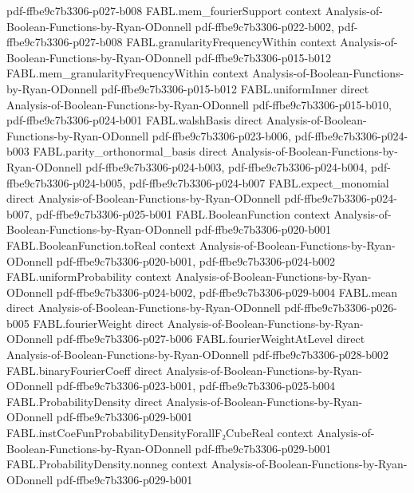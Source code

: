 \begin{theorem}
{    pdf-ffbe9c7b3306-p027-b008}
\proofstep
  {FABL.mem_fourierSupport}
  {context}
  {Analysis-of-Boolean-Functions-by-Ryan-ODonnell}
  {pdf-ffbe9c7b3306-p022-b002,
    pdf-ffbe9c7b3306-p027-b008}
\proofstep
  {FABL.granularityFrequencyWithin}
  {context}
  {Analysis-of-Boolean-Functions-by-Ryan-ODonnell}
  {pdf-ffbe9c7b3306-p015-b012}
\proofstep
  {FABL.mem_granularityFrequencyWithin}
  {context}
  {Analysis-of-Boolean-Functions-by-Ryan-ODonnell}
  {pdf-ffbe9c7b3306-p015-b012}
\proofstep
  {FABL.uniformInner}
  {direct}
  {Analysis-of-Boolean-Functions-by-Ryan-ODonnell}
  {pdf-ffbe9c7b3306-p015-b010,
    pdf-ffbe9c7b3306-p024-b001}
\proofstep
  {FABL.walshBasis}
  {direct}
  {Analysis-of-Boolean-Functions-by-Ryan-ODonnell}
  {pdf-ffbe9c7b3306-p023-b006,
    pdf-ffbe9c7b3306-p024-b003}
\proofstep
  {FABL.parity_orthonormal_basis}
  {direct}
  {Analysis-of-Boolean-Functions-by-Ryan-ODonnell}
  {pdf-ffbe9c7b3306-p024-b003,
    pdf-ffbe9c7b3306-p024-b004,
    pdf-ffbe9c7b3306-p024-b005,
    pdf-ffbe9c7b3306-p024-b007}
\proofstep
  {FABL.expect_monomial}
  {direct}
  {Analysis-of-Boolean-Functions-by-Ryan-ODonnell}
  {pdf-ffbe9c7b3306-p024-b007,
    pdf-ffbe9c7b3306-p025-b001}
\proofstep
  {FABL.BooleanFunction}
  {context}
  {Analysis-of-Boolean-Functions-by-Ryan-ODonnell}
  {pdf-ffbe9c7b3306-p020-b001}
\proofstep
  {FABL.BooleanFunction.toReal}
  {context}
  {Analysis-of-Boolean-Functions-by-Ryan-ODonnell}
  {pdf-ffbe9c7b3306-p020-b001,
    pdf-ffbe9c7b3306-p024-b002}
\proofstep
  {FABL.uniformProbability}
  {context}
  {Analysis-of-Boolean-Functions-by-Ryan-ODonnell}
  {pdf-ffbe9c7b3306-p024-b002,
    pdf-ffbe9c7b3306-p029-b004}
\proofstep
  {FABL.mean}
  {direct}
  {Analysis-of-Boolean-Functions-by-Ryan-ODonnell}
  {pdf-ffbe9c7b3306-p026-b005}
\proofstep
  {FABL.fourierWeight}
  {direct}
  {Analysis-of-Boolean-Functions-by-Ryan-ODonnell}
  {pdf-ffbe9c7b3306-p027-b006}
\proofstep
  {FABL.fourierWeightAtLevel}
  {direct}
  {Analysis-of-Boolean-Functions-by-Ryan-ODonnell}
  {pdf-ffbe9c7b3306-p028-b002}
\proofstep
  {FABL.binaryFourierCoeff}
  {direct}
  {Analysis-of-Boolean-Functions-by-Ryan-ODonnell}
  {pdf-ffbe9c7b3306-p023-b001,
    pdf-ffbe9c7b3306-p025-b004}
\proofstep
  {FABL.ProbabilityDensity}
  {direct}
  {Analysis-of-Boolean-Functions-by-Ryan-ODonnell}
  {pdf-ffbe9c7b3306-p029-b001}
\proofstep
  {FABL.instCoeFunProbabilityDensityForallF₂CubeReal}
  {context}
  {Analysis-of-Boolean-Functions-by-Ryan-ODonnell}
  {pdf-ffbe9c7b3306-p029-b001}
\proofstep
  {FABL.ProbabilityDensity.nonneg}
  {context}
  {Analysis-of-Boolean-Functions-by-Ryan-ODonnell}
  {pdf-ffbe9c7b3306-p029-b001}

\end{theorem}
